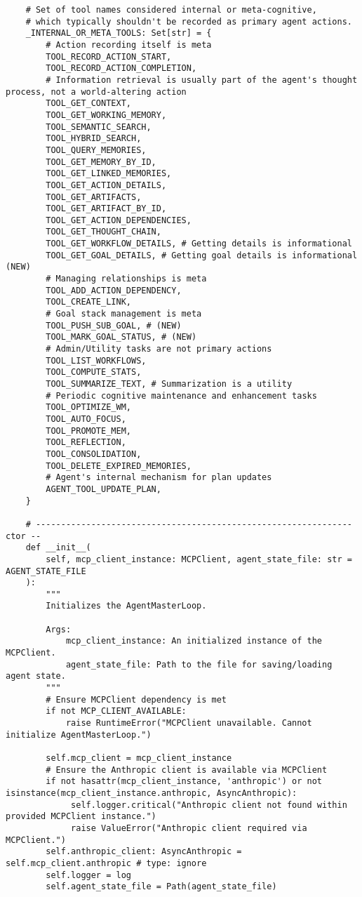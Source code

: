 \documentclass[12pt,a4paper]{article}
\begin{document}
\begin{pageablecode}
\begin{verbatim}
    # Set of tool names considered internal or meta-cognitive,
    # which typically shouldn't be recorded as primary agent actions.
    _INTERNAL_OR_META_TOOLS: Set[str] = {
        # Action recording itself is meta
        TOOL_RECORD_ACTION_START,
        TOOL_RECORD_ACTION_COMPLETION,
        # Information retrieval is usually part of the agent's thought process, not a world-altering action
        TOOL_GET_CONTEXT,
        TOOL_GET_WORKING_MEMORY,
        TOOL_SEMANTIC_SEARCH,
        TOOL_HYBRID_SEARCH,
        TOOL_QUERY_MEMORIES,
        TOOL_GET_MEMORY_BY_ID,
        TOOL_GET_LINKED_MEMORIES,
        TOOL_GET_ACTION_DETAILS,
        TOOL_GET_ARTIFACTS,
        TOOL_GET_ARTIFACT_BY_ID,
        TOOL_GET_ACTION_DEPENDENCIES,
        TOOL_GET_THOUGHT_CHAIN,
        TOOL_GET_WORKFLOW_DETAILS, # Getting details is informational
        TOOL_GET_GOAL_DETAILS, # Getting goal details is informational (NEW)
        # Managing relationships is meta
        TOOL_ADD_ACTION_DEPENDENCY,
        TOOL_CREATE_LINK,
        # Goal stack management is meta
        TOOL_PUSH_SUB_GOAL, # (NEW)
        TOOL_MARK_GOAL_STATUS, # (NEW)
        # Admin/Utility tasks are not primary actions
        TOOL_LIST_WORKFLOWS,
        TOOL_COMPUTE_STATS,
        TOOL_SUMMARIZE_TEXT, # Summarization is a utility
        # Periodic cognitive maintenance and enhancement tasks
        TOOL_OPTIMIZE_WM,
        TOOL_AUTO_FOCUS,
        TOOL_PROMOTE_MEM,
        TOOL_REFLECTION,
        TOOL_CONSOLIDATION,
        TOOL_DELETE_EXPIRED_MEMORIES,
        # Agent's internal mechanism for plan updates
        AGENT_TOOL_UPDATE_PLAN,
    }

    # --------------------------------------------------------------- ctor --
    def __init__(
        self, mcp_client_instance: MCPClient, agent_state_file: str = AGENT_STATE_FILE
    ):
        """
        Initializes the AgentMasterLoop.

        Args:
            mcp_client_instance: An initialized instance of the MCPClient.
            agent_state_file: Path to the file for saving/loading agent state.
        """
        # Ensure MCPClient dependency is met
        if not MCP_CLIENT_AVAILABLE:
            raise RuntimeError("MCPClient unavailable. Cannot initialize AgentMasterLoop.")

        self.mcp_client = mcp_client_instance
        # Ensure the Anthropic client is available via MCPClient
        if not hasattr(mcp_client_instance, 'anthropic') or not isinstance(mcp_client_instance.anthropic, AsyncAnthropic):
             self.logger.critical("Anthropic client not found within provided MCPClient instance.")
             raise ValueError("Anthropic client required via MCPClient.")
        self.anthropic_client: AsyncAnthropic = self.mcp_client.anthropic # type: ignore
        self.logger = log
        self.agent_state_file = Path(agent_state_file)


\end{verbatim}
\end{pageablecode}
\end{document}
